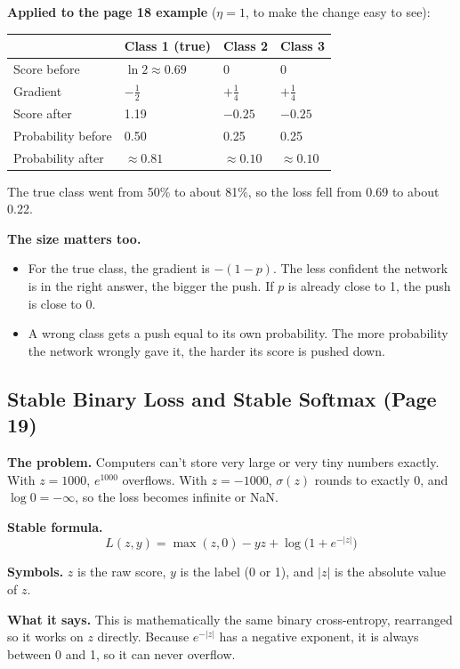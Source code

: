 \textbf{Applied to the page 18 example} ($\eta = 1$, to make the change easy to see):

\begin{tabular}{llll}
\toprule
 & Class 1 (true) & Class 2 & Class 3 \\
\midrule
Score before & $\ln 2 \approx 0.69$ & 0 & 0 \\
Gradient & $-\tfrac12$ & $+\tfrac14$ & $+\tfrac14$ \\
Score after & 1.19 & $-0.25$ & $-0.25$ \\
Probability before & 0.50 & 0.25 & 0.25 \\
Probability after & $\approx 0.81$ & $\approx 0.10$ & $\approx 0.10$ \\
\bottomrule
\end{tabular}

The true class went from 50\% to about 81\%, so the loss fell from 0.69 to about 0.22.

\textbf{The size matters too.}
\begin{itemize}
  \item For the true class, the gradient is $-(1 - p)$. The less confident the network is in the right answer, the bigger the push. If $p$ is already close to 1, the push is close to 0.
  \item A wrong class gets a push equal to its own probability. The more probability the network wrongly gave it, the harder its score is pushed down.
\end{itemize}

\subsection*{Stable Binary Loss and Stable Softmax (Page 19)}

\textbf{The problem.} Computers can't store very large or very tiny numbers exactly. With $z = 1000$, $e^{1000}$ overflows. With $z = -1000$, $\sigma(z)$ rounds to exactly 0, and $\log 0 = -\infty$, so the loss becomes infinite or NaN.

\textbf{Stable formula.}
\[
L(z, y) = \max(z, 0) - yz + \log\big(1 + e^{-|z|}\big)
\]

\textbf{Symbols.} $z$ is the raw score, $y$ is the label (0 or 1), and $|z|$ is the absolute value of $z$.

\textbf{What it says.} This is mathematically the same binary cross-entropy, rearranged so it works on $z$ directly. Because $e^{-|z|}$ has a negative exponent, it is always between 0 and 1, so it can never overflow.

